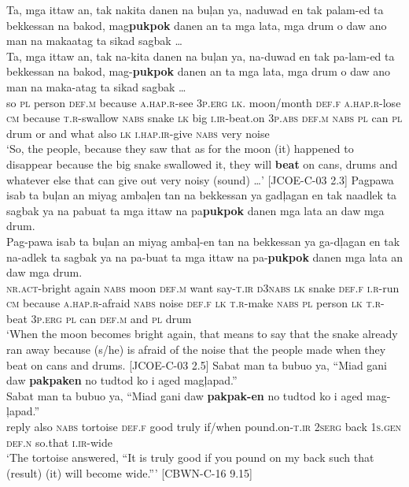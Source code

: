 \ea
Ta,  mga  ittaw  an,  tak  nakita  danen  na  buļan  ya, naduwad  en  tak  palam-ed  ta  bekkessan  na  bakod, mag\textbf{pukpok}  danen  an  ta  mga  lata,  mga  drum  o  daw  ano  man  na  makaatag  ta  sikad  sagbak … \\\smallskip
\gll Ta,  mga  ittaw  an,  tak  na-kita  danen  na  buļan  ya, na-duwad  en  tak  pa-lam-ed  ta  bekkessan  na  bakod, mag-\textbf{pukpok}  danen  an  ta  mga  lata,  mga  drum  o  daw  ano\footnotemark{}  man  na  maka-atag  ta  sikad  sagbak … \\
so  \textsc{pl}  person  \textsc{def.m}  because  \textsc{a.hap.r}-see  3\textsc{p.erg}  \textsc{lk}.  moon/month  \textsc{def.f}
\textsc{a.hap.r}-lose  \textsc{cm}  because  \textsc{t.r}-swallow  \textsc{nabs}  snake  \textsc{lk}  big
\textsc{i.ir}-beat.on  3\textsc{p.abs}  \textsc{def.m}  \textsc{nabs}  \textsc{pl}  can  \textsc{pl}  drum  or  and  what  also
\textsc{lk}  \textsc{i.hap.ir}-give  \textsc{nabs}  very  noise \\
\glt `So, the people, because they saw that as for the moon (it) happened to disappear because the big snake swallowed it, they will \textbf{beat} on cans, drums and whatever else that can give out very noisy (sound) …’ [JCOE-C-03 2.3]
\z
\ea
Pagpawa  isab  ta  buļan  an  miyag  ambaļen  tan  na bekkessan  ya  gadļagan  en  tak  naadlek  ta  sagbak  ya na  pabuat  ta  mga  ittaw  na  pa\textbf{pukpok}  danen  mga  lata  an daw  mga  drum. \\\smallskip
\gll Pag-pawa  isab  ta  buļan  an  miyag  ambaļ-en  tan  na bekkessan  ya  ga-dļagan  en  tak  na-adlek  ta  sagbak  ya na  pa-buat  ta  mga  ittaw  na  pa-\textbf{pukpok}  danen  mga  lata  an daw  mga  drum. \\
\textsc{nr.act}-bright  again  \textsc{nabs}  moon  \textsc{def.m}  want  say-\textsc{t.ir}  \textsc{d3nabs}  \textsc{lk} snake  \textsc{def.f}  \textsc{i.r}-run  \textsc{cm}  because  \textsc{a.hap.r}-afraid  \textsc{nabs}  noise  \textsc{def.f} \textsc{lk}  \textsc{t.r}-make  \textsc{nabs}  \textsc{pl}  person  \textsc{lk}  \textsc{t.r}-beat  3\textsc{p.erg}  \textsc{pl}  can  \textsc{def.m} and  \textsc{pl}  drum \\
\glt `When the moon becomes bright again, that means to say that the snake already ran away because (s/he) is afraid of the noise that the people made when they beat on cans and drums.  [JCOE-C-03 2.5]
\z
\ea
Sabat  man  ta  bubuo  ya,  “Miad  gani  daw  \textbf{pakpaken}  no tudtod  ko  i  aged  magļapad.” \\\smallskip
\gll Sabat  man  ta  bubuo  ya,  “Miad  gani  daw  \textbf{pakpak-en}  no tudtod  ko  i  aged  mag-ļapad.” \\
reply  also  \textsc{nabs}  tortoise  \textsc{def.f}  good  truly  if/when  pound.on-\textsc{t.ir}  \textsc{2serg}
back  1\textsc{s.gen}  \textsc{def.n}  so.that  \textsc{i.ir}-wide \\
\glt `The tortoise answered, “It is truly good if you pound on my back such that (result) (it) will become wide.”' [CBWN-C-16 9.15]
\z


